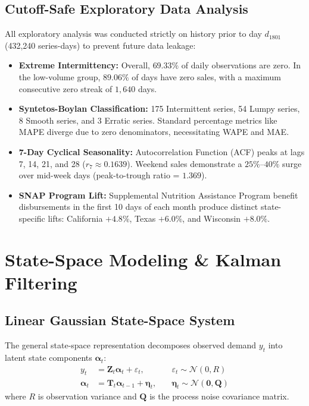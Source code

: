 \documentclass[11pt,a4paper]{article}
\begin{document}
\subsection{Cutoff-Safe Exploratory Data Analysis}
All exploratory analysis was conducted strictly on history prior to day $d_{1801}$ (432,240 series-days) to prevent future data leakage:
\begin{itemize}
    \item \textbf{Extreme Intermittency:} Overall, $69.33\%$ of daily observations are zero. In the low-volume group, $89.06\%$ of days have zero sales, with a maximum consecutive zero streak of $1,640$ days.
    \item \textbf{Syntetos-Boylan Classification:} 175 Intermittent series, 54 Lumpy series, 8 Smooth series, and 3 Erratic series. Standard percentage metrics like MAPE diverge due to zero denominators, necessitating WAPE and MAE.
    \item \textbf{7-Day Cyclical Seasonality:} Autocorrelation Function (ACF) peaks at lags 7, 14, 21, and 28 ($r_7 \approx 0.1639$). Weekend sales demonstrate a $25\%\text{--}40\%$ surge over mid-week days (peak-to-trough ratio = $1.369$).
    \item \textbf{SNAP Program Lift:} Supplemental Nutrition Assistance Program benefit disbursements in the first 10 days of each month produce distinct state-specific lifts: California $+4.8\%$, Texas $+6.0\%$, and Wisconsin $+8.0\%$.
\end{itemize}

\section{State-Space Modeling \& Kalman Filtering}

\subsection{Linear Gaussian State-Space System}
The general state-space representation decomposes observed demand $y_t$ into latent state components $\boldsymbol{\alpha}_t$:
\begin{align}
y_t &= \mathbf{Z}_t \boldsymbol{\alpha}_t + \varepsilon_t, \quad &\varepsilon_t \sim \mathcal{N}(0, R) \\
\boldsymbol{\alpha}_t &= \mathbf{T}_t \boldsymbol{\alpha}_{t-1} + \boldsymbol{\eta}_t, \quad &\boldsymbol{\eta}_t \sim \mathcal{N}(\mathbf{0}, \mathbf{Q})
\end{align}
where $R$ is observation variance and $\mathbf{Q}$ is the process noise covariance matrix.
\end{document}
